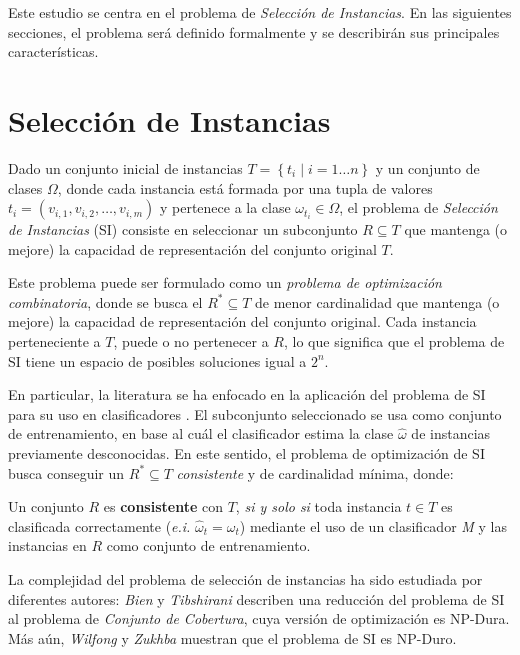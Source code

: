 Este estudio se centra en el problema de \emph{Selección de Instancias}. En las siguientes secciones, el problema será definido formalmente y se describirán sus principales características.

\section{Selección de Instancias}

Dado un conjunto inicial de instancias $T = \left\{ t_i \mid i = 1 \dots n \right\}$ y un conjunto de clases $\Omega$, donde cada instancia está formada por una tupla de valores $t_i = (v_{i,1}, v_{i,2}, \dots, v_{i,m})$ y pertenece a la clase $\omega_{t_i} \in \Omega$, el problema de \emph{Selección de Instancias} (SI) consiste en seleccionar un subconjunto $R \subseteq T$ que mantenga (o mejore) la capacidad de representación del conjunto original $T$.

Este problema puede ser formulado como un \emph{problema de optimización combinatoria}, donde se busca el $R^* \subseteq T$ de menor cardinalidad que mantenga (o mejore) la capacidad de representación del conjunto original. Cada instancia perteneciente a $T$, puede o no pertenecer a $R$, lo que significa que el problema de SI tiene un espacio de posibles soluciones igual a $2^n$.

En particular, la literatura se ha enfocado en la aplicación del problema de SI para su uso en clasificadores \cite{DBLP:journals/corr/GottliebK14,DBLP:conf/jcdcg/Toussaint02}. El subconjunto seleccionado se usa como conjunto de entrenamiento, en base al cuál el clasificador estima la clase $\hat{\omega}$ de instancias previamente desconocidas. En este sentido, el problema de optimización de SI busca conseguir un $R^* \subseteq T$ \emph{consistente} y de cardinalidad mínima, donde:\\

\begin{definicion}
Un conjunto $R$ es \textbf{consistente} con $T$, \emph{si y solo si} toda instancia $t \in T$ es clasificada correctamente (\emph{e.i.} $\hat{\omega}_t = \omega_t$) mediante el uso de un clasificador \emph{M} y las instancias en $R$ como conjunto de entrenamiento.
\end{definicion}

La complejidad del problema de selección de instancias ha sido estudiada por diferentes autores: \emph{Bien} y \emph{Tibshirani} \cite{2012arXiv1202.5933B} describen una reducción del problema de SI al problema de \emph{Conjunto de Cobertura}, cuya versión de optimización es NP-Dura. Más aún, \emph{Wilfong} \cite{Wilfong:1991:NNP:109648.109673} y  \emph{Zukhba} \cite{Zukhba:2010:NPP:1921730.1921735} muestran que el problema de SI es NP-Duro.

